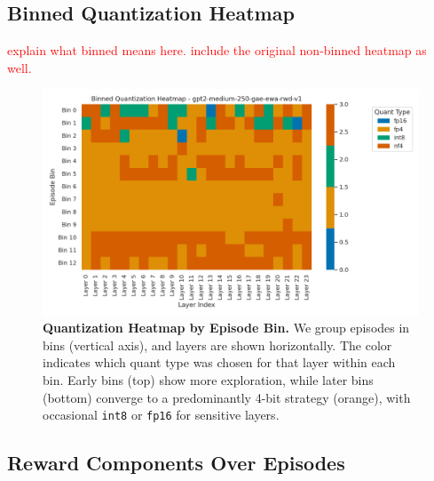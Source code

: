 \documentclass{article}
\newcommand{\red}[1]{\textcolor{red}{#1}}
\begin{document}
	\subsection{Binned Quantization Heatmap}
	\label{sec:medium-heatmap}

	\red{explain what binned means here. include the original non-binned heatmap as well.}
	
	\begin{figure}[ht]
		\centering
		\includegraphics[width=1.0\columnwidth]{gpt2-medium-250-gae-ewa-rwd-v1_quant_heatmap_binned.png}
		\caption{\small
			\textbf{Quantization Heatmap by Episode Bin.}
			We group episodes in bins (vertical axis), and layers are shown horizontally. 
			The color indicates which quant type was chosen for that layer within each bin. 
			Early bins (top) show more exploration, while later bins (bottom) converge to a predominantly 4-bit strategy (orange), with occasional \texttt{int8} or \texttt{fp16} for sensitive layers.
		}
		\label{fig:gpt2medium-binned-heatmap}
	\end{figure}
	
	\subsection{Reward Components Over Episodes}
	\label{sec:medium-rewards}
	
\end{document}
